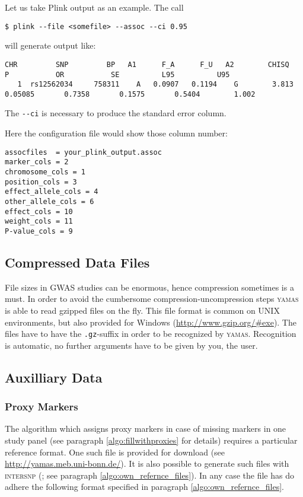 Let us take Plink \citep{Purcell2007} output as an example. The call
\begin{lstlisting}[style=shell]
$ plink --file <somefile> --assoc --ci 0.95
\end{lstlisting}
will generate output like:
\begin{lstlisting}[style=Plain]
 CHR         SNP         BP   A1      F_A      F_U   A2        CHISQ            P           OR           SE          L95          U95
   1  rs12562034     758311    A   0.0907   0.1194    G        3.813      0.05085       0.7358       0.1575       0.5404        1.002
\end{lstlisting}
The \verb+--ci+ is necessary to produce the standard error column.

Here the configuration file would show those column number:
\begin{lstlisting}[style=Plain]
assocfiles  = your_plink_output.assoc
marker_cols = 2
chromosome_cols = 1
position_cols = 3
effect_allele_cols = 4
other_allele_cols = 6
effect_cols = 10
weight_cols = 11
P-value_cols = 9
\end{lstlisting}

\subsection{Compressed Data Files}
File sizes in GWAS studies can be enormous, hence compression sometimes is a must. In order to avoid the cumbersome compression-uncompression steps \textsc{yamas} is able to read gzipped files on the fly. This file format is common on UNIX environments, but also provided for Windows (\url{http://www.gzip.org/#exe}). The files have to have the \verb+.gz+-suffix in order to be recognized by \textsc{yamas}. Recognition is automatic, no further arguments have to be given by you, the user.

\subsection{Auxilliary Data}

\subsubsection{Proxy Markers}
\label{usage:proxy_markers}

The algorithm which assigns proxy markers in case of missing markers in one study panel (see paragraph \ref{algo:fillwithproxies} for details) requires a particular reference format. One such file is provided for download (see \url{http://yamas.meb.uni-bonn.de/}). It is also possible to generate such files with \textsc{intersnp} (\citet{Herold2009,Becker2010}; see paragraph \ref{algo:own_refernce_files}). In any case the file has do adhere the following format specified in paragraph \ref{algo:own_refernce_files}.

